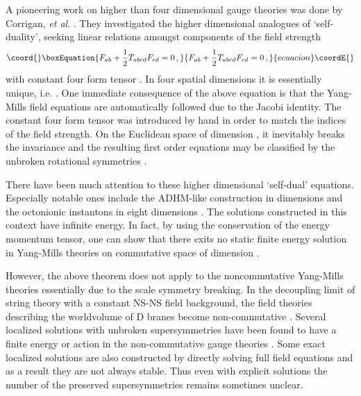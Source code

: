 \documentclass[a4paper,11pt]{article}
\begin{document}
A pioneering work on higher  than four dimensional gauge theories was done by Corrigan, \textit{et al}. \cite{cdfn}. They investigated the higher
dimensional analogues of `self-duality', seeking linear relations amongst components of the field strength
\begin{equation}\coord{}\boxEquation{
F_{ab}+\frac{1}{2}T_{abcd}F_{cd}=0\,, \label{BPS}
}{
F_{ab}+\frac{1}{2}T_{abcd}F_{cd}=0\,, }{ecuacion}\coordE{}\end{equation}
with constant four form tensor \coordHE{}. In four spatial dimensions it is essentially unique, i.e. \coordHE{}. One immediate consequence
of the above equation is that the Yang-Mills field equations \coordHE{} are automatically followed due to the Jacobi identity. The constant
four form tensor was introduced by hand in order to match the indices of the field strength. On the Euclidean space of dimension \coordHE{}, it inevitably
breaks the \coordHE{} invariance and the resulting first order equations may be classified by the unbroken rotational symmetries
\cite{cdfn,ward}.



There have been much attention  to these higher dimensional `self-dual' equations. Especially notable ones include the
ADHM-like construction in \coordHE{} dimensions \cite{4kADHM} and the octonionic instantons in eight dimensions
\cite{fubini,harveystrominger}. The solutions constructed in this context have infinite energy. In fact, by using the
conservation of the energy momentum tensor, one can show that there exits no static finite energy solution
 in Yang-Mills theories on commutative space of  dimension \coordHE{} \cite{jaffe}.



However, the above theorem does not apply to the noncommutative Yang-Mills  theories    essentially due to the scale symmetry breaking. In the
decoupling limit of string theory with a constant NS-NS \coordHE{} field background, the field theories describing the worldvolume of D branes become
non-commutative \cite{non-comm}. Several localized  solutions with unbroken  supersymmetries have been found to have a finite energy or action in
the non-commutative gauge theories \cite{shift,witten,kraus}. Some exact localized solutions are also constructed by directly solving full field
equations \cite{kraus,park,aganagic,harvey} and as a result  they are not always stable. Thus even with explicit solutions the number of the
preserved supersymmetries remains sometimes unclear.
\end{document}
